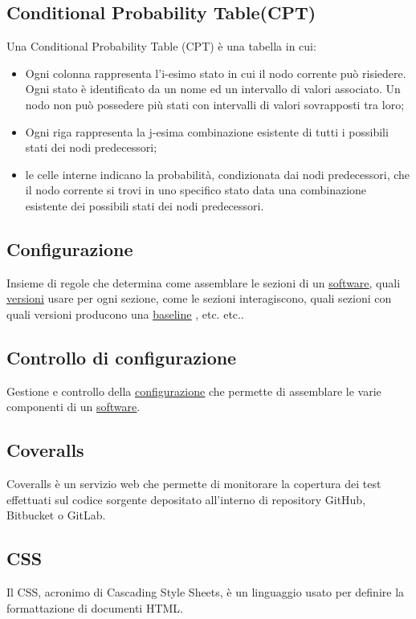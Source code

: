 	\subsection{Conditional Probability Table(CPT)}
	\label{sec:CPT}
	Una Conditional Probability Table (CPT) è una tabella in cui:
		\begin{itemize}
			\item{Ogni colonna rappresenta l'i-esimo stato in cui il nodo corrente può risiedere. Ogni stato è identificato da un nome ed un intervallo di valori associato. Un nodo non può possedere più stati con intervalli di valori sovrapposti tra loro;}
			\item{Ogni riga rappresenta la j-esima combinazione esistente di tutti i possibili stati dei nodi predecessori;}
			\item{le celle interne indicano la probabilità, condizionata dai nodi predecessori, che il nodo corrente si trovi in uno specifico stato data una combinazione esistente dei possibili stati dei nodi predecessori.}
		\end{itemize}


	\subsection{Configurazione}
	\label{sec:configurazione}
	Insieme di regole che determina come assemblare le sezioni di un \underline{\hyperref[sec:prodottosoftware]{software}}, quali \underline{\hyperref[sec:versione]{versioni}} usare per ogni sezione, come le sezioni interagiscono, quali sezioni con quali versioni producono una \underline{\hyperref[sec:baseline]{baseline}} , etc. etc..


	\subsection{Controllo di configurazione}
	\label{sec:controlloconfigurazione}
	Gestione e controllo della \underline{\hyperref[sec:configurazione]{configurazione}} che permette di assemblare le varie componenti di un \underline{\hyperref[sec:prodottosoftware]{software}}.
	\subsection{Coveralls}
	\label{sec:coveralls}
	Coveralls è un servizio web che permette di monitorare la copertura dei test effettuati sul codice sorgente depositato all'interno di repository GitHub, Bitbucket o GitLab.
	\subsection{CSS}
	\label{sec:CSS}
	Il CSS, acronimo di Cascading Style Sheets, è un linguaggio usato per definire la formattazione di documenti HTML.
	\newpage


